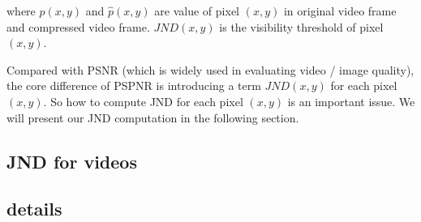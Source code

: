 where $p(x, y)$ and $\hat{p}(x, y)$ are value of pixel $(x, y)$ in original video frame and compressed video frame. $JND(x, y)$ is the visibility threshold of pixel $(x, y)$.

Compared with PSNR (which is widely used in evaluating video / image quality), the core difference of PSPNR is introducing a term $JND(x, y)$ for each pixel $(x, y)$. So how to compute JND for each pixel $(x, y)$ is an important issue. We will present our JND computation in the following section.

\subsection{JND for \vr videos}
\label{subsec:jnd:framework}


\subsection{\vrjnd details}
\label{subsec:jnd:details}